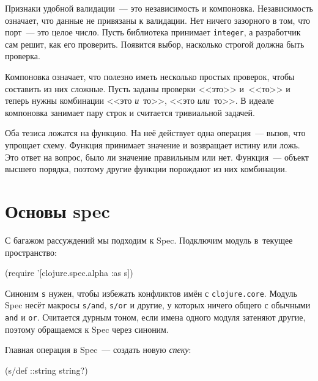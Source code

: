 
Признаки удобной валидации~--- это независимость и компоновка. Независимость
означает, что данные не привязаны к валидации. Нет ничего зазорного в том, что
порт~--- это целое число. Пусть библиотека принимает \verb|integer|, а разработчик
сам решит, как его проверить. Появится выбор, насколько строгой должна быть
проверка.


Компоновка означает, что полезно иметь несколько простых проверок, чтобы
составить из них сложные. Пусть заданы проверки <<это>> и~<<то>> и теперь нужны
комбинации <<это \emph{и}~то>>, <<это \emph{или}~то>>. В идеале компоновка
занимает пару строк и считается тривиальной задачей.


Оба тезиса ложатся на функцию. На неё действует одна операция~--- вызов, что
упрощает схему. Функция принимает значение и возвращает истину или ложь. Это
ответ на вопрос, было ли значение правильным или нет. Функция~--- объект
высшего порядка, поэтому другие функции порождают из них комбинации.

\section{Основы spec}

С багажом рассуждений мы подходим к Spec. Подключим модуль в~текущее
пространство:

\begin{english}
  \begin{clojure}
(require '[clojure.spec.alpha :as s])
  \end{clojure}
\end{english}

Синоним \verb|s| нужен, чтобы избежать конфликтов имён с
\verb|clojure.core|. Модуль Spec несёт макросы \verb|s/and|, \verb|s/or| и
другие, у которых ничего общего с обычными \verb|and| и \verb|or|. Считается
дурным тоном, если имена одного модуля затеняют другие, поэтому обращаемся к
Spec через синоним.


Главная операция в Spec~--- создать новую \emph{спеку}:

\begin{english}
  \begin{clojure}
(s/def ::string string?)
  \end{clojure}
\end{english}

